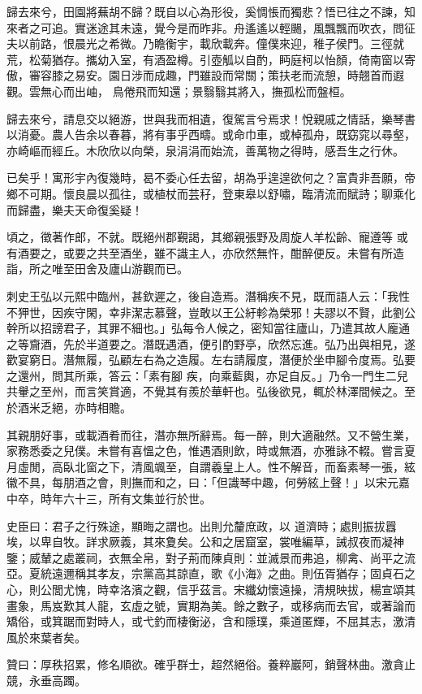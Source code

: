 \begin{pinyinscope}
 歸去來兮，田園將蕪胡不歸？既自以心為形役，奚惆悵而獨悲？悟已往之不諫，知來者之可追。實迷途其未遠，覺今是而昨非。舟遙遙以輕颺，風飄飄而吹衣，問征夫以前路，恨晨光之希微。乃瞻衡宇，載欣載奔。僮僕來迎，稚子侯門。三徑就荒，松菊猶存。攜幼入室，有酒盈樽。引壺觚以自酌，眄庭柯以怡顏，倚南窗以寄傲，審容膝之易安。園日涉而成趣，門雖設而常關；策扶老而流憩，時翹首而遐觀。雲無心而出岫，
 鳥倦飛而知還；景翳翳其將入，撫孤松而盤桓。



 歸去來兮，請息交以絕游，世與我而相遺，復駕言兮焉求！悅親戚之情話，樂琴書以消憂。農人告余以春暮，將有事乎西疇。或命巾車，或棹孤舟，既窈窕以尋壑，亦崎嶇而經丘。木欣欣以向榮，泉涓涓而始流，善萬物之得時，感吾生之行休。



 已矣乎！寓形宇內復幾時，曷不委心任去留，胡為乎遑遑欲何之？富貴非吾願，帝鄉不可期。懷良晨以孤往，或植杖而芸秄，登東皋以舒嘯，臨清流而賦詩；聊乘化而歸盡，樂夫天命復奚疑！



 頃之，徵著作郎，不就。既絕州郡覲謁，其鄉親張野及周旋人羊松齡、寵遵等
 或有酒要之，或要之共至酒坐，雖不識主人，亦欣然無忤，酣醉便反。未嘗有所造詣，所之唯至田舍及廬山游觀而已。



 刺史王弘以元熙中臨州，甚欽遲之，後自造焉。潛稱疾不見，既而語人云：「我性不狎世，因疾守閑，幸非潔志慕聲，豈敢以王公紆軫為榮邪！夫謬以不賢，此劉公幹所以招謗君子，其罪不細也。」弘每令人候之，密知當往廬山，乃遣其故人龐通之等齎酒，先於半道要之。潛既遇酒，便引酌野亭，欣然忘進。弘乃出與相見，遂歡宴窮日。潛無履，弘顧左右為之造履。左右請履度，潛便於坐申腳令度焉。弘要之還州，問其所乘，答云：「素有腳
 疾，向乘藍輿，亦足自反。」乃令一門生二兒共轝之至州，而言笑賞適，不覺其有羨於華軒也。弘後欲見，輒於林澤間候之。至於酒米乏絕，亦時相贍。



 其親朋好事，或載酒肴而往，潛亦無所辭焉。每一醉，則大適融然。又不營生業，家務悉委之兒僕。未嘗有喜慍之色，惟遇酒則飲，時或無酒，亦雅詠不輟。嘗言夏月虛閒，高臥北窗之下，清風颯至，自謂羲皇上人。性不解音，而畜素琴一張，絃徽不具，每朋酒之會，則撫而和之，曰：「但識琴中趣，何勞絃上聲！」以宋元嘉中卒，時年六十三，所有文集並行於世。



 史臣曰：君子之行殊途，顯晦之謂也。出則允釐庶政，以
 道濟時；處則振拔囂埃，以卑自牧。詳求厥義，其來夐矣。公和之居窟室，裳唯編草，誡叔夜而凝神鑒；威輦之處叢祠，衣無全帛，對子荊而陳貞則：並滅景而弗追，柳禽、尚平之流亞。夏統遠邇稱其孝友，宗黨高其諒直，歌《小海》之曲。則伍胥猶存；固貞石之心，則公閭尤愧，時幸洛濱之觀，信乎茲言。宋纖幼懷遠操，清規映拔，楊宣頌其畫象，馬岌歎其人龍，玄虛之號，實期為美。餘之數子，或移病而去官，或著論而矯俗，或箕踞而對時人，或弋釣而棲衡泌，含和隱璞，乘道匿輝，不屈其志，激清風於來葉者矣。



 贊曰：厚秩招累，修名順欲。確乎群士，超然絕俗。養粹巖阿，銷聲林曲。激貪止競，永垂高躅。



\end{pinyinscope}